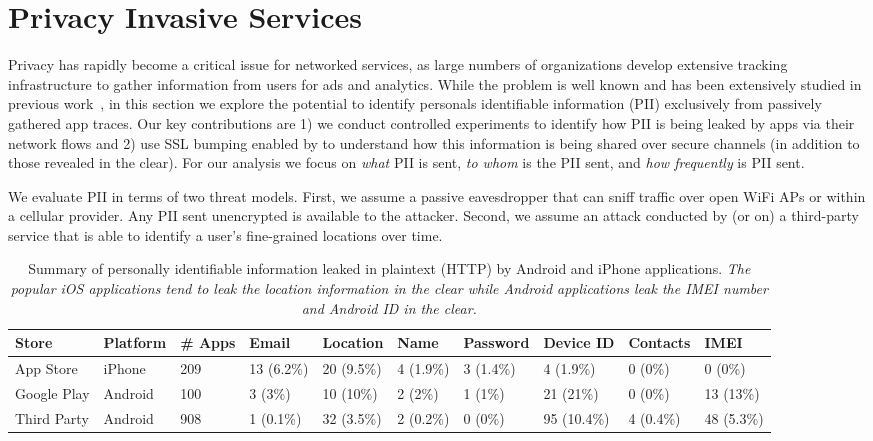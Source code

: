 \section{Privacy Invasive Services}
\label{sec:characterize-app}

Privacy has rapidly become a critical issue for networked services, as large numbers of organizations develop 
extensive tracking infrastructure to gather information from users for ads and analytics. While the problem 
is well known and has been extensively studied in previous work~\cite{roesner:webtrackers,leontiadis:mobileads,vallina-rod:ads}, in this section we explore the potential to 
identify personals identifiable information (PII) exclusively from passively gathered app traces. Our key 
contributions are 1) we conduct controlled experiments to identify how PII is being leaked by apps via 
their network flows and 2) use SSL bumping enabled by \platname{} to understand how this information is being shared over 
secure channels (in addition to those revealed in the clear). 
For our analysis we focus on {\it what} PII is sent,  {\it to whom} is the PII sent, and {\it how frequently} is PII sent.

We evaluate PII in terms of two threat models. First, we assume a passive eavesdropper that can sniff 
traffic over open WiFi APs or within a cellular provider. Any PII sent unencrypted is available to the attacker. 
Second, we assume an attack conducted by (or on) a third-party service that is able to identify a user's fine-grained locations 
over time. 

\begin{table}[t]    
    \centering
    \begin{small}
    \begin{tabular}{|l|l|l|l|l|l|l|l|l|l|}
       \hline
       {\bf Store}&{\bf Platform}&{\bf \# Apps}&{\bf Email}& {\bf Location}& {\bf Name} &{\bf Password}& {\bf Device ID}& {\bf Contacts}& {\bf IMEI}\\
       \hline
       App Store&iPhone&209&13 (6.2\%) &20 (9.5\%)&4 (1.9\%)&3 (1.4\%)&4 (1.9\%)&0 (0\%)&0 (0\%)\\
       \hline
       Google Play&Android&100&3 (3\%)&10 (10\%)&2 (2\%)&1 (1\%)&21 (21\%)&0 (0\%)&13 (13\%)\\
       \hline
       Third Party&Android&908&1 (0.1\%)&32 (3.5\%)&2 (0.2\%)&0 (0\%)&95 (10.4\%)&4 (0.4\%)&48 (5.3\%)\\
       \hline
    \end{tabular}
    \end{small}
    \caption{Summary of personally identifiable information leaked in plaintext (HTTP) by Android and iPhone applications. \emph{The popular iOS applications tend to leak the location information in the clear while Android applications leak the IMEI number and Android ID in the clear.}}
    \label{tab:pii}
\end{table}

